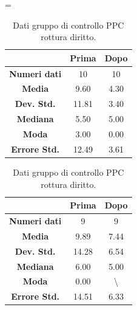 \begin{table}
\centering
\setlength\tabcolsep{4pt}
\begin{minipage}{0.48\textwidth}
\centering
\tablewidth=\textwidth

\begin{tabular}{|c|c|c|} \hline
{\textbf{}} & {\textbf{  \hspace{8pt}Prima\hspace{8pt} }} & {\textbf{ \hspace{8pt}Dopo\hspace{8pt}  }}\\ \hline
\textbf{Numeri dati} & 10 & 10 \\ 
\textbf{Media} & 9.60 & 4.30 \\  
\textbf{Dev. Std.} & 11.81 & 3.40 \\  
\textbf{Mediana} & 5.50 & 5.00 \\ 
\textbf{Moda} & 3.00 & 0.00 \\ 
\textbf{Errore Std.} & 12.49 & 3.61 \\ 
\hline
\end{tabular}
\caption{Dati gruppo sperimentale PPC rottura diritto.}

\label{tab:accuracy} 
\end{minipage}%
\hfill
\begin{minipage}{0.48\textwidth}
\centering

\begin{tabular}{|c|c|c|} \hline
{\textbf{}} & {\textbf{  \hspace{8pt}Prima\hspace{8pt} }} & {\textbf{ \hspace{8pt}Dopo\hspace{8pt}  }}\\ \hline
\textbf{Numeri dati} & 9 & 9 \\ 
\textbf{Media} & 9.89 & 7.44 \\  
\textbf{Dev. Std.} & 14.28 & 6.54 \\  
\textbf{Mediana} & 6.00 & 5.00 \\  
\textbf{Moda} & 0.00 & \textbackslash \\
\textbf{Errore Std.} & 14.51 & 6.33 \\
\hline
\end{tabular}
\caption{Dati gruppo di controllo PPC rottura diritto.}

 \label{tab:ompdiff} 
\end{minipage}
\hfill
\begin{minipage}{0.48\textwidth}
\centering


\end{minipage}
\end{table}
